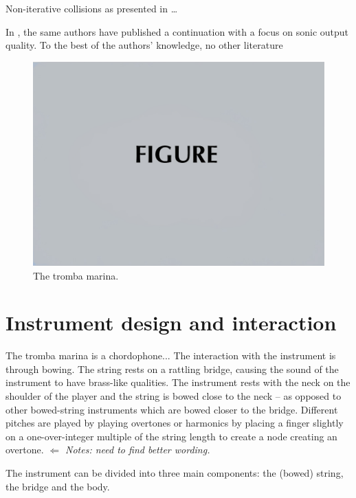 \documentclass[reprint,NumberedRefs]{JASAnew}
\begin{document}
Non-iterative collisions as presented in \cite{ducceschi2019} \dots

In \cite{bilbao2019}, the same authors have published a continuation with a focus on sonic output quality. To the best of the authors' knowledge, no other literature 


 
\begin{figure}[ht]
\includegraphics[width=\reprintcolumnwidth]{figsamp.jpg}
\caption{\label{fig:tromba}{The tromba marina.}}
\end{figure}

\section{\label{sec:2} Instrument design and interaction}
The tromba marina is a chordophone... The interaction with the instrument is through bowing. The string rests on a rattling bridge, causing the sound of the instrument to have brass-like qualities.
The instrument rests with the neck on the shoulder of the player and the string is bowed close to the neck -- as opposed to other bowed-string instruments which are bowed closer to the bridge. Different pitches are played by playing overtones or harmonics by placing a finger slightly on a one-over-integer multiple of the string length to create a node creating an overtone. \textit{$\Leftarrow$ Notes: need to find better wording.}

The instrument can be divided into three main components: the (bowed) string, the bridge and the body. 
\end{document}

